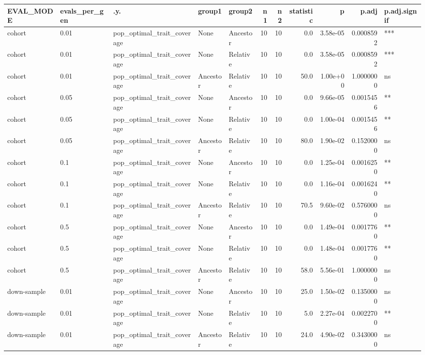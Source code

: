\documentclass[
]{book}
\begin{document}
\begin{tabular}{l|l|l|l|l|r|r|r|r|r|l}
\hline
EVAL\_MODE & evals\_per\_gen & .y. & group1 & group2 & n1 & n2 & statistic & p & p.adj & p.adj.signif\\
\hline
cohort & 0.01 & pop\_optimal\_trait\_coverage & None & Ancestor & 10 & 10 & 0.0 & 3.58e-05 & 0.0008592 & ***\\
\hline
cohort & 0.01 & pop\_optimal\_trait\_coverage & None & Relative & 10 & 10 & 0.0 & 3.58e-05 & 0.0008592 & ***\\
\hline
cohort & 0.01 & pop\_optimal\_trait\_coverage & Ancestor & Relative & 10 & 10 & 50.0 & 1.00e+00 & 1.0000000 & ns\\
\hline
cohort & 0.05 & pop\_optimal\_trait\_coverage & None & Ancestor & 10 & 10 & 0.0 & 9.66e-05 & 0.0015456 & **\\
\hline
cohort & 0.05 & pop\_optimal\_trait\_coverage & None & Relative & 10 & 10 & 0.0 & 1.00e-04 & 0.0015456 & **\\
\hline
cohort & 0.05 & pop\_optimal\_trait\_coverage & Ancestor & Relative & 10 & 10 & 80.0 & 1.90e-02 & 0.1520000 & ns\\
\hline
cohort & 0.1 & pop\_optimal\_trait\_coverage & None & Ancestor & 10 & 10 & 0.0 & 1.25e-04 & 0.0016250 & **\\
\hline
cohort & 0.1 & pop\_optimal\_trait\_coverage & None & Relative & 10 & 10 & 0.0 & 1.16e-04 & 0.0016240 & **\\
\hline
cohort & 0.1 & pop\_optimal\_trait\_coverage & Ancestor & Relative & 10 & 10 & 70.5 & 9.60e-02 & 0.5760000 & ns\\
\hline
cohort & 0.5 & pop\_optimal\_trait\_coverage & None & Ancestor & 10 & 10 & 0.0 & 1.49e-04 & 0.0017760 & **\\
\hline
cohort & 0.5 & pop\_optimal\_trait\_coverage & None & Relative & 10 & 10 & 0.0 & 1.48e-04 & 0.0017760 & **\\
\hline
cohort & 0.5 & pop\_optimal\_trait\_coverage & Ancestor & Relative & 10 & 10 & 58.0 & 5.56e-01 & 1.0000000 & ns\\
\hline
down-sample & 0.01 & pop\_optimal\_trait\_coverage & None & Ancestor & 10 & 10 & 25.0 & 1.50e-02 & 0.1350000 & ns\\
\hline
down-sample & 0.01 & pop\_optimal\_trait\_coverage & None & Relative & 10 & 10 & 5.0 & 2.27e-04 & 0.0022700 & **\\
\hline
down-sample & 0.01 & pop\_optimal\_trait\_coverage & Ancestor & Relative & 10 & 10 & 24.0 & 4.90e-02 & 0.3430000 & ns\\

\end{tabular}
\end{document}
